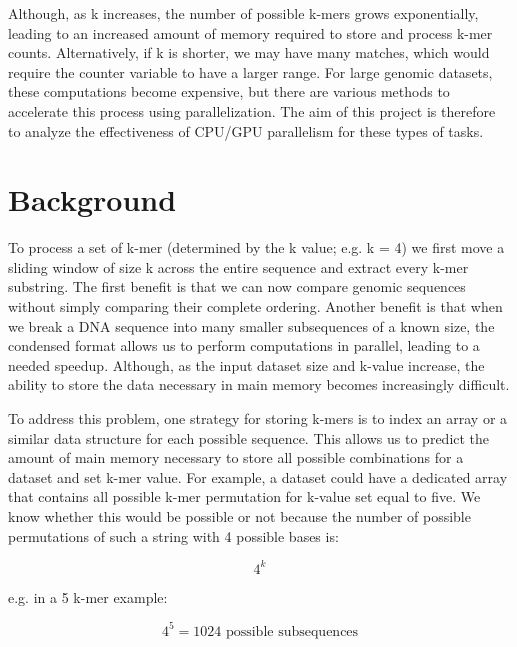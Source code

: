 \documentclass{article}
\begin{document}
\vspace{\baselineskip}

Although, as k increases, the number of possible k-mers grows exponentially, leading to an increased amount of memory required to 
store and process k-mer counts. Alternatively, if k is shorter, we may have many matches, which would require the counter variable to 
have a larger range. 
For large genomic datasets, these computations become expensive, but there are various methods to accelerate this 
process using parallelization. The aim of this project is therefore to analyze the effectiveness of CPU/GPU parallelism for these  
types of tasks.

\section{Background}

\vspace{\baselineskip}

To process a set of k-mer (determined by the k value; e.g. k = 4) we first move a sliding window of size k across the entire sequence and extract every k-mer substring.  
The first benefit is that we can now compare genomic sequences without simply comparing their complete ordering. Another benefit is that when we 
break a DNA sequence into many smaller subsequences of a known size, the condensed format allows us to perform computations in parallel, 
leading to a needed speedup. Although, as the input dataset size and k-value increase, the ability to store the data necessary in main memory becomes 
increasingly difficult.  

\vspace{\baselineskip}

To address this problem, one strategy for storing k-mers is to index an array or a similar data structure for each possible sequence. 
This allows us to predict the amount of main memory necessary to store all possible combinations for a dataset and set k-mer value.  
For example, a dataset could have a dedicated array that contains all possible k-mer permutation for k-value set equal to five.  
We know whether this would be possible or not because the number of possible permutations of such a string with 4  
possible bases is:
 
\[
4^k
\]

e.g. in a 5 k-mer example:

\[
4^5 = 1024 \text{ possible subsequences}
\]
\end{document}
